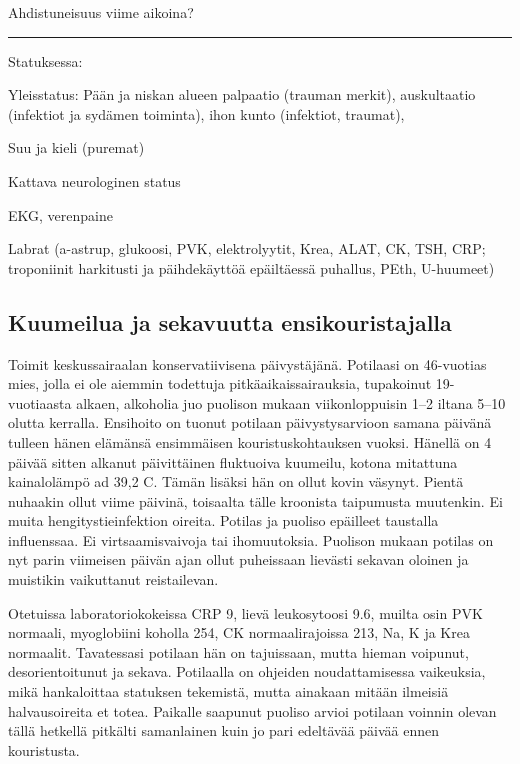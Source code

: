 \documentclass[
]{book}
\begin{document}
Ahdistuneisuus viime aikoina?

\begin{center}\rule{0.5\linewidth}{0.5pt}\end{center}

Statuksessa:

Yleisstatus: Pään ja niskan alueen palpaatio (trauman merkit), auskultaatio (infektiot ja sydämen toiminta), ihon kunto (infektiot, traumat),

Suu ja kieli (puremat)

Kattava neurologinen status

EKG, verenpaine

Labrat (a-astrup, glukoosi, PVK, elektrolyytit, Krea, ALAT, CK, TSH, CRP; troponiinit harkitusti ja päihdekäyttöä epäiltäessä puhallus, PEth, U-huumeet)

\subsection{Kuumeilua ja sekavuutta ensikouristajalla}\label{kuumeilua-ja-sekavuutta-ensikouristajalla}

Toimit keskussairaalan konservatiivisena päivystäjänä. Potilaasi on 46-vuotias mies, jolla ei ole aiemmin todettuja pitkäaikaissairauksia, tupakoinut 19-vuotiaasta alkaen, alkoholia juo puolison mukaan viikonloppuisin 1--2 iltana 5--10 olutta kerralla. Ensihoito on tuonut potilaan päivystysarvioon samana päivänä tulleen hänen elämänsä ensimmäisen kouristuskohtauksen vuoksi. Hänellä on 4 päivää sitten alkanut päivittäinen fluktuoiva kuumeilu, kotona mitattuna kainalolämpö ad 39,2 C. Tämän lisäksi hän on ollut kovin väsynyt. Pientä nuhaakin ollut viime päivinä, toisaalta tälle kroonista taipumusta muutenkin. Ei muita hengitystieinfektion oireita. Potilas ja puoliso epäilleet taustalla influenssaa. Ei virtsaamisvaivoja tai ihomuutoksia. Puolison mukaan potilas on nyt parin viimeisen päivän ajan ollut puheissaan lievästi sekavan oloinen ja muistikin vaikuttanut reistailevan.

Otetuissa laboratoriokokeissa CRP 9, lievä leukosytoosi 9.6, muilta osin PVK normaali, myoglobiini koholla 254, CK normaalirajoissa 213, Na, K ja Krea normaalit. Tavatessasi potilaan hän on tajuissaan, mutta hieman voipunut, desorientoitunut ja sekava. Potilaalla on ohjeiden noudattamisessa vaikeuksia, mikä hankaloittaa statuksen tekemistä, mutta ainakaan mitään ilmeisiä halvausoireita et totea. Paikalle saapunut puoliso arvioi potilaan voinnin olevan tällä hetkellä pitkälti samanlainen kuin jo pari edeltävää päivää ennen kouristusta.
\end{document}
